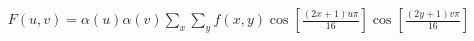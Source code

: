 \documentclass[preview]{standalone}
\begin{document}
\begin{align*}
F(u,v)=\alpha(u)\alpha(v)\!\sum_{x}\!\sum_{y}f(x,y)\cos\!\left[\tfrac{(2x+1)u\pi}{16}\right]\!\cos\!\left[\tfrac{(2y+1)v\pi}{16}\right]
\end{align*}
\end{document}
